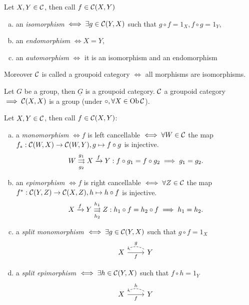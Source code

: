 \documentclass[a4paper]{report}
\begin{document}
\begin{defi}
  Let $X, Y \in \mathcal{C}$, then call $f \in \mathcal{C}(X,Y)$
  \begin{enumerate}[(a)]
    \item an \emph{isomorphism} $\iff \exists g \in \mathcal{C}(Y,X)$ such that $g \circ f = 1_{X}, f \circ g = 1_{Y}$,
    \item an \emph{endomorphism} $\iff X =Y$,
    \item an \emph{automorphism} $\iff$ it is an isomorphism and an endomorphism
  \end{enumerate}
  Moreover $\mathcal{C}$ is called a groupoid category $\iff$ all morphisms are isomorphisms.
\end{defi}
\begin{exmp*}
Let $G$ be a group, then $\underline G$ is a groupoid category. $\mathcal{C}$ a groupoid category $\implies \mathcal{C}(X,X)$ is a group (under $\circ, \forall X \in \operatorname{Ob} \mathcal{C}$).
\end{exmp*}

\begin{defi}
  Let $X, Y \in \mathcal{C}$, then call $f \in \mathcal{C}(X,Y)$:
  \begin{enumerate}[(a)]
    \item a \emph{monomorphism} $\iff f$ is left cancellable $\iff \forall W \in \mathcal{C}$ the map $f_{*}: \mathcal{C}(W,X) \to \mathcal{C}(W,Y), g \mapsto f \circ g$ is injective. \[W \overunderset {g_{1}}{g_{2}}\rightrightarrows X \xrightarrow f Y : f \circ g_{1} = f \circ g_{2} \imp g_{1}= g_{2}.\]
    \item an \emph{epimorphism $\iff f$} is right cancellable $\iff \forall Z \in \mathcal{C}$ the map $f^{*}: \mathcal{C}(Y,Z) \to \mathcal{C}(X,Z), h \mapsto h \circ f$ is injective. \[X \xrightarrow f Y \overunderset {h_{1}}{h_{2}}\rightrightarrows  Z: h_{1} \circ f = h_{2} \circ f \imp h_{1}= h_{2}.\]
          \item a \emph{split monomorphism} $\iff \exists g \in \mathcal{C}(Y,X)$ such that $g \circ f = 1_{X}$ \[\begin{tikzcd}
X \arrow[r, "f"'] & Y \arrow[l, "g"', dashed, bend right]
\end{tikzcd}\]

          \item a \emph{split epimorphism} $\iff \exists h \in \mathcal{C}(Y,X)$ such that $f \circ h = 1_{Y}$ \[\begin{tikzcd}
X \arrow[r, "f"'] & Y \arrow[l, "h"', dashed, bend right]
\end{tikzcd}\]
  \end{enumerate}
\end{defi}
\end{document}
